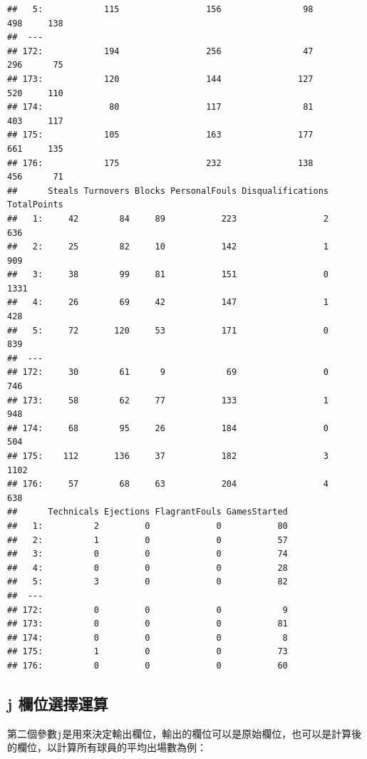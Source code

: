 \documentclass[]{book}
\theoremstyle{definition}
\theoremstyle{definition}
\theoremstyle{remark}
\begin{document}
\begin{verbatim}
##   5:            115                 156                98           498     138
##  ---                                                                           
## 172:            194                 256                47           296      75
## 173:            120                 144               127           520     110
## 174:             80                 117                81           403     117
## 175:            105                 163               177           661     135
## 176:            175                 232               138           456      71
##      Steals Turnovers Blocks PersonalFouls Disqualifications TotalPoints
##   1:     42        84     89           223                 2         636
##   2:     25        82     10           142                 1         909
##   3:     38        99     81           151                 0        1331
##   4:     26        69     42           147                 1         428
##   5:     72       120     53           171                 0         839
##  ---                                                                    
## 172:     30        61      9            69                 0         746
## 173:     58        62     77           133                 1         948
## 174:     68        95     26           184                 0         504
## 175:    112       136     37           182                 3        1102
## 176:     57        68     63           204                 4         638
##      Technicals Ejections FlagrantFouls GamesStarted
##   1:          2         0             0           80
##   2:          1         0             0           57
##   3:          0         0             0           74
##   4:          0         0             0           28
##   5:          3         0             0           82
##  ---                                                
## 172:          0         0             0            9
## 173:          0         0             0           81
## 174:          0         0             0            8
## 175:          1         0             0           73
## 176:          0         0             0           60
\end{verbatim}

\subsection{j 欄位選擇運算}\label{j-}

第二個參數\texttt{j}是用來決定輸出欄位，輸出的欄位可以是原始欄位，也可以是計算後的欄位，以計算所有球員的平均出場數為例：
\end{document}
